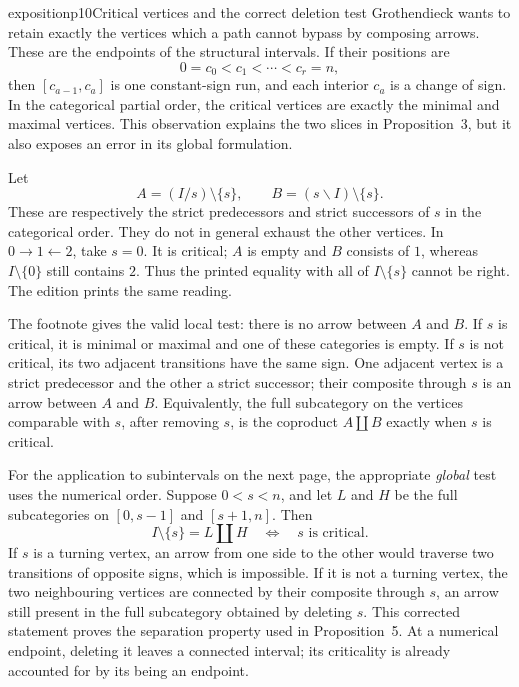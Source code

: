 \begin{dcomment}{exposition}{p10}{Critical vertices and the correct deletion test}
Grothendieck wants to retain exactly the vertices which a path cannot bypass by composing arrows. These are the endpoints of the structural intervals. If their positions are
\[
 0=c_0<c_1<\cdots<c_r=n,
\]
then $[c_{a-1},c_a]$ is one constant-sign run, and each interior $c_a$ is a change of sign. In the categorical partial order, the critical vertices are exactly the minimal and maximal vertices. This observation explains the two slices in Proposition~3, but it also exposes an error in its global formulation.

Let
\[
 A=(I/s)\setminus\{s\},\qquad
 B=(s\backslash I)\setminus\{s\}.
\]
These are respectively the strict predecessors and strict successors of $s$ in the categorical order. They do not in general exhaust the other vertices. In $0\to1\leftarrow2$, take $s=0$. It is critical; $A$ is empty and $B$ consists of $1$, whereas $I\setminus\{0\}$ still contains $2$. Thus the printed equality with all of $I\setminus\{s\}$ cannot be right. The edition prints the same reading.

The footnote gives the valid local test: there is no arrow between $A$ and $B$. If $s$ is critical, it is minimal or maximal and one of these categories is empty. If $s$ is not critical, its two adjacent transitions have the same sign. One adjacent vertex is a strict predecessor and the other a strict successor; their composite through $s$ is an arrow between $A$ and $B$. Equivalently, the full subcategory on the vertices comparable with $s$, after removing $s$, is the coproduct $A\amalg B$ exactly when $s$ is critical.

For the application to subintervals on the next page, the appropriate \emph{global} test uses the numerical order. Suppose $0<s<n$, and let $L$ and $H$ be the full subcategories on $[0,s-1]$ and $[s+1,n]$. Then
\[
 I\setminus\{s\}=L\amalg H
 \quad\Longleftrightarrow\quad s\text{ is critical}.
\]
If $s$ is a turning vertex, an arrow from one side to the other would traverse two transitions of opposite signs, which is impossible. If it is not a turning vertex, the two neighbouring vertices are connected by their composite through $s$, an arrow still present in the full subcategory obtained by deleting $s$. This corrected statement proves the separation property used in Proposition~5. At a numerical endpoint, deleting it leaves a connected interval; its criticality is already accounted for by its being an endpoint.
\end{dcomment}

